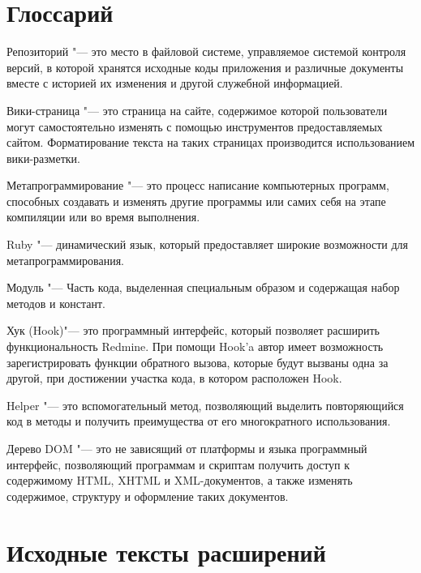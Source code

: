 \appendix

\makeatletter
\gdef\thechapter{\@Asbuk\c@chapter}
\makeatother

\chapter{Глоссарий}

Репозиторий "--- это место в файловой системе, управляемое системой контроля
версий, в которой хранятся исходные коды приложения и различные документы
вместе с историей их изменения и другой служебной информацией.

Вики-страница "--- это страница на сайте, содержимое которой пользователи могут
самостоятельно изменять с помощью инструментов предоставляемых сайтом.
Форматирование текста на таких страницах производится использованием
вики-разметки.

Метапрограммирование "--- это процесс написание компьютерных программ,
способных создавать и изменять другие программы или самих себя на этапе
компиляции или во время выполнения.

Ruby "--- динамический язык, который предоставляет широкие возможности для
метапрограммирования.

Модуль "--- Часть кода, выделенная специальным образом и
содержащая набор методов и констант.

Хук (Hook)"--- это программный интерфейс, который позволяет
расширить функциональность Redmine. При помощи Hook'a автор имеет возможность
зарегистрировать функции обратного вызова, которые будут вызваны одна за
другой, при достижении участка кода, в котором расположен Hook.

Helper "--- это вспомогательный метод, позволяющий выделить
повторяющийся код в методы и получить преимущества от его многократного
использования.

Дерево DOM "---  это не зависящий от платформы и языка программный интерфейс,
позволяющий программам и скриптам получить доступ к содержимому HTML, XHTML и
XML-документов, а также изменять содержимое, структуру и оформление таких
документов.


\chapter{Исходные тексты расширений}

